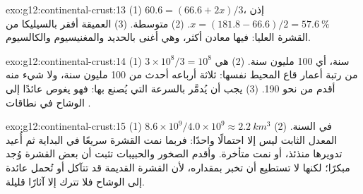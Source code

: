 \begin{solution}{exo:g12:continental-crust:13}
(1) $60.6 = (66.6 + 2x)/3$، إذن $x = (181.8 - 66.6)/2 = \qty{57.6}{\percent}$.
(2) متوسطة. (3)  العميقة أفقر بالسيليكا من
القشرة العليا: فيها معادن  أكثر، وهي أغنى بالحديد والمغنيسيوم والكالسيوم.
\end{solution}

\begin{solution}{exo:g12:continental-crust:14}
(1) $3 \times 10^8/3 = 10^8$ سنة، أي 100 مليون سنة. (2) هي من رتبة
أعمار قاع المحيط نفسها: ثلاثة أرباعه أحدث من 100 مليون سنة،
ولا شيء منه أقدم من نحو 190. (3) يجب أن يُدمَّر بالسرعة التي يُصنع بها:
فهو يغوص عائدًا إلى الوشاح في نطاقات .
\end{solution}

\begin{solution}{exo:g12:continental-crust:15}
(1) $8.6 \times 10^9 / 4.0 \times 10^9 \approx \qty{2.2}{km^3}$ في السنة.
(2) المعدل الثابت ليس إلا احتمالًا واحدًا: فربما نمت القشرة سريعًا في البداية
ثم أُعيد تدويرها منذئذ، أو نمت متأخرة. وأقدم الصخور والحبيبات تثبت
أن بعض القشرة وُجد مبكرًا؛ لكنها لا تستطيع أن تخبر بمقداره، لأن القشرة القديمة
قد تتآكل أو تُحمل عائدة إلى الوشاح فلا تترك إلا آثارًا قليلة.
\end{solution}

